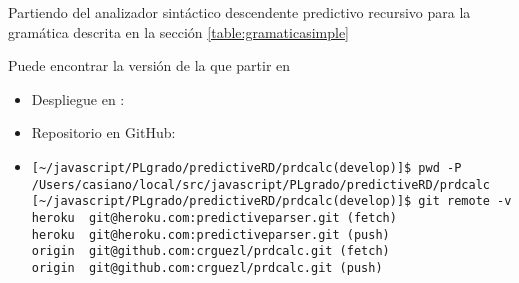 Partiendo del analizador sintáctico descendente predictivo recursivo para la gramática
descrita en la sección \ref{table:gramaticasimple}

Puede encontrar la versión de la que partir en

\begin{itemize}
\item Despliegue en \Heroku{}:
\item Repositorio en GitHub:
\item
\begin{verbatim}
[~/javascript/PLgrado/predictiveRD/prdcalc(develop)]$ pwd -P
/Users/casiano/local/src/javascript/PLgrado/predictiveRD/prdcalc
[~/javascript/PLgrado/predictiveRD/prdcalc(develop)]$ git remote -v
heroku  git@heroku.com:predictiveparser.git (fetch)
heroku  git@heroku.com:predictiveparser.git (push)
origin  git@github.com:crguezl/prdcalc.git (fetch)
origin  git@github.com:crguezl/prdcalc.git (push)
\end{verbatim}
\end{itemize}

